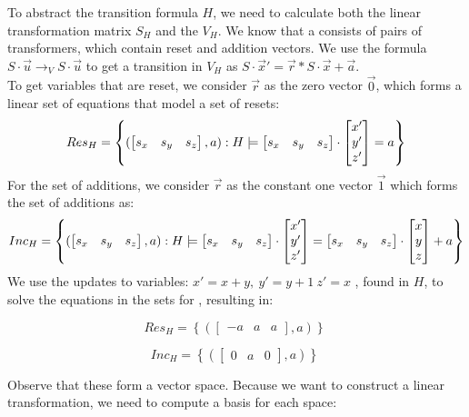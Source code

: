 To abstract the transition formula $H$, we need to calculate both the linear transformation matrix $S_H$ and the \qvasr $V_H$. We know that a \qvasr consists of pairs of transformers, which contain reset and addition vectors. We use the formula $S \cdot \vec{u} \rightarrow_V S \cdot \vec{u}$ to get a transition in $V_H$ as $S\cdot\vec{x}' = \vec{r}*S\cdot\vec{x} + \vec{a}$. \\ To get variables that are reset, we consider $\vec{r}$ as the zero vector $\vec{0}$, which forms a linear set of equations that model a set of resets:
\begin{equation*}
	Res_H = \left\{ (\begin{bmatrix} s_x & s_y & s_z \end{bmatrix}, a) : H \models \begin{bmatrix} s_x & s_y & s_z \end{bmatrix} \cdot \begin{bmatrix} x' \\ y' \\ z' \end{bmatrix} = a \right\}	
\end{equation*}
For the set of additions, we consider $\vec{r}$ as the constant one vector $\vec{1}$ which forms the set of additions as:
\begin{equation*}
	Inc_H = \left\{(\begin{bmatrix} s_x & s_y & s_z \end{bmatrix}, a) : H \models \begin{bmatrix} s_x & s_y & s_z \end{bmatrix} \cdot \begin{bmatrix} x' \\ y' \\ z' \end{bmatrix} = \begin{bmatrix} s_x & s_y & s_z \end{bmatrix} \cdot \begin{bmatrix} x \\ y \\ z \end{bmatrix} + a\right\}	
\end{equation*}
We use the updates to variables: $x' = x + y, \ y'= y + 1\ z' = x$ , found in $H$, to solve the equations in the sets for \s, resulting in: 
\vspace*{-0.5em}
\begin{center}
	\begin{minipage}{0.5\linewidth}
		\begin{equation*}
			Res_H = \left\{ (\begin{bmatrix} -a & a & a \end{bmatrix}, a) \right\}\
		\end{equation*}
	\end{minipage}
	\begin{minipage}{0.4\linewidth}
		\begin{equation*}
			Inc_H = \left\{ (\begin{bmatrix} 0 & a & 0 \end{bmatrix}, a) \right\}\ 
		\end{equation*}
	\end{minipage}
\end{center}
Observe that these form a vector space. Because we want to construct a linear transformation, we need to compute a basis for each space:
\vspace*{-1em}
